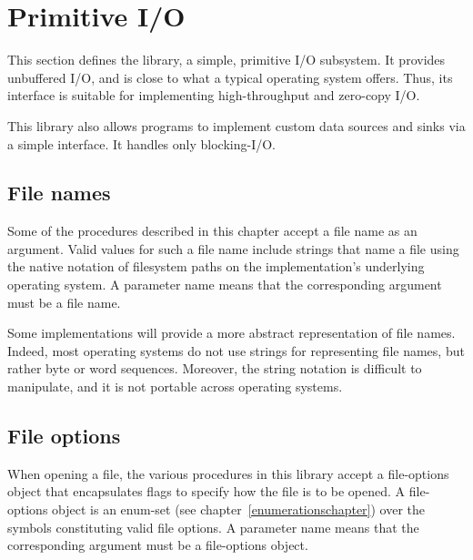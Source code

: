 \section{Primitive I/O}
\label{primiosection}

This section defines the  library, a
simple, primitive I/O subsystem.  It provides unbuffered I/O, and is
close to what a typical operating system offers. Thus, its interface
is suitable for implementing high-throughput and zero-copy I/O.

This library also allows programs to implement custom data
sources and sinks via a simple interface.
It handles only blocking-I/O.

\subsection{File names}

Some of the procedures described in this chapter accept a file name as an
argument. Valid values for such a file name include strings that name a file
using the native notation of filesystem paths on the implementation's underlying
operating system.
A  parameter name means that the
corresponding argument must be a file name.

Some implementations will provide a more
abstract representation of file names. Indeed, most operating
systems do not use strings for representing file names, but rather byte
or word sequences. Moreover, the string notation is difficult to manipulate, and
it is not portable across operating systems.

\subsection{File options}
\label{fileoptionssection}

When opening a file, the various procedures in this library accept a
{\cf file-options} object that encapsulates flags to specify how
the file is to be opened. A {\cf file-options} object is an enum-set
(see chapter~\ref{enumerationschapter}) over the symbols constituting
valid file options.
A  parameter name means that the
corresponding argument must be a file-options object.

